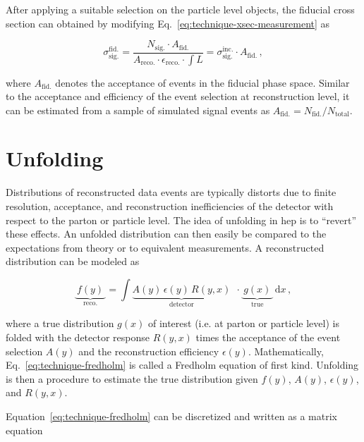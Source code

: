 After applying a suitable selection on the particle level objects, the fiducial cross section can obtained by modifying Eq.~\ref{eq:technique-xsec-measurement} as

\begin{equation}
\sigma_\mathrm{sig.}^\mathrm{fid.}=\frac{N_\mathrm{sig.}\cdot A_\mathrm{fid.}}{A_\mathrm{reco.}\cdot\epsilon_\mathrm{reco.}\cdot{\textstyle{\int}L}} =\sigma_\mathrm{sig.}^\mathrm{inc.}\cdot A_\mathrm{fid.}\,,
\end{equation}

where $A_\mathrm{fid.}$ denotes the acceptance of events in the fiducial phase space. Similar to the acceptance and efficiency of the event selection at reconstruction level, it can be estimated from a sample of simulated signal events as $A_\mathrm{fid.}=N_\mathrm{fid.}/N_\mathrm{total}$. 



\section{Unfolding}

Distributions of reconstructed data events are typically distorts due to finite resolution, acceptance, and reconstruction inefficiencies of the detector with respect to the parton or particle level. The idea of unfolding in \gls{hep} is to ``revert'' these effects. An unfolded distribution can then easily be compared to the expectations from theory or to equivalent measurements. A reconstructed distribution can be modeled as

\begin{equation}
\underbrace{~f(y)~}_\mathrm{reco.}=\int \underbrace{A(y)\,\epsilon(y)\, R(y,x)}_\mathrm{detector}~~\cdot \underbrace{~g(x)~}_\mathrm{true}\, \mathrm{d}x\,, \label{eq:technique-fredholm}
\end{equation}

where a true distribution $g(x)$ of interest (i.e. at parton or particle level) is folded with the detector response $R(y,x)$ times the acceptance of the event selection $A(y)$ and the reconstruction efficiency $\epsilon(y)$. Mathematically, Eq.~\ref{eq:technique-fredholm} is called a Fredholm equation of first kind. Unfolding is then a procedure to estimate the true distribution given $f(y)$, $A(y)$, $\epsilon(y)$, and $R(y,x)$. 

Equation~\ref{eq:technique-fredholm} can be discretized and written as a matrix equation

